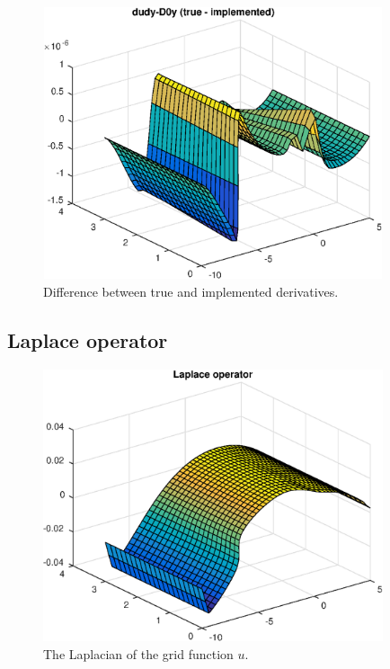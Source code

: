 \documentclass[a4paper,10pt]{article}
\begin{document}
\begin{figure}[ht]
  \centering
  \includegraphics[width = 10cm, height = 8cm]{dudyD0y}
  \begin{minipage}[t]{100mm}
    \caption{
      Difference between true and implemented derivatives.
    }\label{FIG_jjj}
  \end{minipage}
\end{figure}

\FloatBarrier

\subsection*{Laplace operator}

\begin{figure}[ht]
  \centering
  \includegraphics[width = 10cm, height = 8cm]{Laplace}
  \begin{minipage}[t]{100mm}
    \caption{
      The Laplacian of the grid function $u$.
    }\label{FIG_jjj}
  \end{minipage}
\end{figure}
\end{document}
